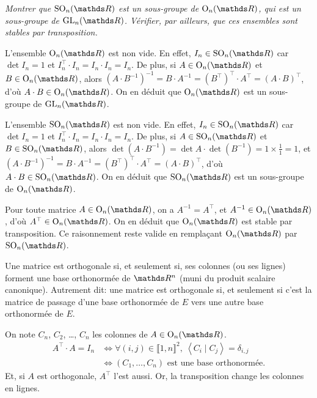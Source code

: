 \begin{exo}
  \textsl{Montrer que $\mathrm{SO}_n(\R)$\/ est un sous-groupe de $\mathrm{O}_n(\R)$, qui est un sous-groupe de $\mathrm{GL}_n(\R)$. Vérifier, par ailleurs, que ces ensembles sont stables par transposition.}

  L'ensemble $\mathrm{O}_n(\R)$\/ est non vide.
  En effet, $I_n \in \mathrm{SO}_n(\R)$\/ car $\det I_n = 1$\/ et $I_n^\top \cdot I_n = I_n \cdot I_n = I_n$.
  De plus, si $A \in \mathrm{O}_n(\R)$\/ et $B \in \mathrm{O}_n(\R)$, alors $(A\cdot B^{-1})^{-1} = B \cdot A^{-1} = (B^\top)^\top \cdot A^\top = (A \cdot B)^\top$, d'où $A\cdot B \in \mathrm{O}_n(\R)$.
  On en déduit que $\mathrm{O}_n(\R)$\/ est un sous-groupe de $\mathrm{GL}_n(\R)$.

  L'ensemble $\mathrm{SO}_n(\R)$\/ est non vide. En effet, $I_n \in \mathrm{SO}_n(\R)$\/ car $\det I_n = 1$\/ et $I_n^\top \cdot I_n = I_n \cdot I_n = I_n$.
  De plus, si $A \in \mathrm{SO}_n(\R)$\/ et $B \in \mathrm{SO}_n(\R)$, alors $\det(A \cdot B^{-1}) = \det A \cdot \det (B^{-1}) = 1 \times \frac{1}{1} = 1$, et $(A\cdot B^{-1})^{-1} = B \cdot A^{-1} = (B^\top)^\top \cdot A^\top = (A \cdot B)^\top$, d'où $A\cdot B \in \mathrm{SO}_n(\R)$.
  On en déduit que $\mathrm{SO}_n(\R)$\/ est un sous-groupe de $\mathrm{O}_n(\R)$.

  Pour toute matrice $A \in \mathrm{O}_n(\R)$, on a $A^{-1} = A^\top$, et $A^{-1} \in \mathrm{O}_n(\R)$, d'où $A^\top \in \mathrm{O}_n(\R)$. On en déduit que $\mathrm{O}_n(\R)$\/ est stable par transposition.
  Ce raisonnement reste valide en remplaçant $\mathrm{O}_n(\R)$\/ par $\mathrm{SO}_n(\R)$.
\end{exo}

\begin{prop}
  Une matrice est orthogonale si, et seulement si, ses colonnes (ou ses lignes) forment une base orthonormée de $\R^n$\/ (muni du produit scalaire canonique).
  Autrement dit: une matrice est orthogonale si, et seulement si c'est la matrice de passage d'une base orthonormée de $E$\/ vers une autre base orthonormée de $E$.
\end{prop}

\begin{prv}
  On note $C_n$, $C_2$, \ldots, $C_n$\/ les colonnes de $A \in \mathrm{O}_n(\R)$.
  \begin{align*}
    A^\top \cdot A = I_n &\iff \forall (i,j) \in \llbracket 1,n \rrbracket^2,\: \left<C_i  \mid C_j \right> = \delta_{i,j}\\
    &\iff (C_1, \ldots, C_n) \text{ est une base orthonormée}.
  \end{align*}
  Et, si $A$\/ est orthogonale, $A^\top$\/ l'est aussi. Or, la transposition change les colonnes en lignes.
\end{prv}


